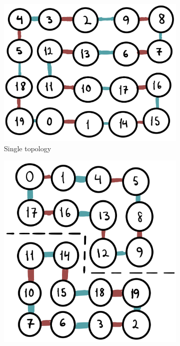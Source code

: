 \documentclass[a4paper,11pt,aps,tightenlines,nofootinbib]{revtex4}
\begin{document}
        \begin{figure}[h] \label{simplex-topology}
                \begin{subfigure}[b]{.3\textwidth}
                \includegraphics[scale=.05]{images/simplex-ring.jpg}
                \caption{Single topology}
                \end{subfigure}
                \begin{subfigure}[b]{.2\textwidth}
                \includegraphics[scale=.05]{images/simplex-donuts.jpg}

\end{subfigure}
\end{figure}
\end{document}
